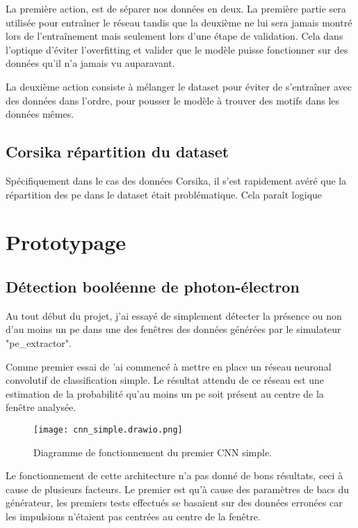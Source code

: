 La première action, est de séparer nos données en deux. La première partie sera utilisée pour entraîner le réseau tandis que la deuxième ne
lui sera jamais montré lors de l'entraînement mais seulement lors d'une étape de validation. Cela dans l'optique d'éviter l'overfitting
et valider que le modèle puisse fonctionner sur des données qu'il n'a jamais vu auparavant.

La deuxième action consiste à mélanger le dataset pour éviter de s'entraîner avec des données dans l'ordre, pour pousser 
le modèle à trouver des motifs dans les données mêmes.

\subsection{Corsika répartition du dataset}
Spécifiquement dans le cas des données Corsika, il s'est rapidement avéré que la répartition des \gls{pe} dans le dataset était problématique.
Cela paraît logique





\section{Prototypage}

\subsection{Détection booléenne de photon-électron}
Au tout début du projet, j'ai essayé de simplement détecter la présence ou non d'au moins un \gls{pe} dans une des fenêtres des données générées par le simulateur "pe\_extractor".

Comme premier essai de 
'ai commencé à mettre en place un réseau neuronal convolutif de classification simple.
Le résultat attendu de ce réseau est une estimation de la probabilité qu'au moins un \gls{pe} soit présent au centre de la fenêtre analysée.

\begin{figure}[tbph!]
	\centering
	\texttt{[image: cnn\_simple.drawio.png]}
	\caption[Diagramme de fonctionnement du premier CNN simple]{Diagramme de fonctionnement du premier CNN simple.}
\end{figure}

Le fonctionnement de cette architecture n'a pas donné de bons résultats, ceci à cause de plusieurs facteurs. Le premier est qu'à cause des paramètres
de bacs du générateur, les premiers tests effectués se basaient sur des données erronées car les impulsions n'étaient pas centrées au centre de la fenêtre.

